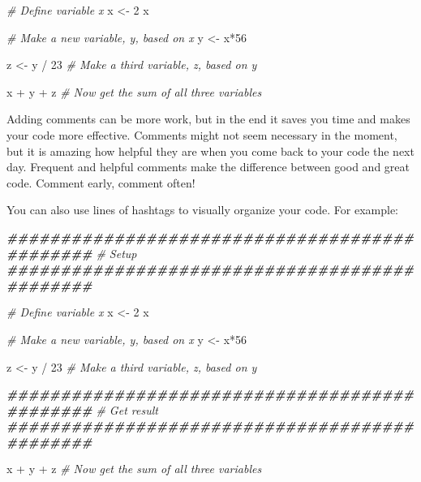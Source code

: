 \documentclass[
]{book}
\newenvironment{Shaded}{\begin{snugshade}}{\end{snugshade}}
\newcommand{\CommentTok}[1]{\textcolor[rgb]{0.56,0.35,0.01}{\textit{#1}}}
\newcommand{\DecValTok}[1]{\textcolor[rgb]{0.00,0.00,0.81}{#1}}
\newcommand{\DocumentationTok}[1]{\textcolor[rgb]{0.56,0.35,0.01}{\textbf{\textit{#1}}}}
\newcommand{\NormalTok}[1]{#1}
\newcommand{\OtherTok}[1]{\textcolor[rgb]{0.56,0.35,0.01}{#1}}
\newcommand{\SpecialCharTok}[1]{\textcolor[rgb]{0.00,0.00,0.00}{#1}}
\begin{document}
\begin{Shaded}
\begin{Highlighting}[]
\CommentTok{\# Define variable x}
\NormalTok{x }\OtherTok{\textless{}{-}} \DecValTok{2} 
\NormalTok{x}

\CommentTok{\# Make a new variable, y, based on x}
\NormalTok{y }\OtherTok{\textless{}{-}}\NormalTok{ x}\SpecialCharTok{*}\DecValTok{56}

\NormalTok{z }\OtherTok{\textless{}{-}}\NormalTok{ y }\SpecialCharTok{/} \DecValTok{23} \CommentTok{\# Make a third variable, z, based on y}
 
\NormalTok{x }\SpecialCharTok{+}\NormalTok{ y }\SpecialCharTok{+}\NormalTok{ z }\CommentTok{\# Now get the sum of all three variables}
\end{Highlighting}
\end{Shaded}

Adding comments can be more work, but in the end it saves you time and makes your code more effective. Comments might not seem necessary in the moment, but it is amazing how helpful they are when you come back to your code the next day. Frequent and helpful comments make the difference between good and great code. Comment early, comment often!

You can also use lines of hashtags to visually organize your code. For example:

\begin{Shaded}
\begin{Highlighting}[]
\DocumentationTok{\#\#\#\#\#\#\#\#\#\#\#\#\#\#\#\#\#\#\#\#\#\#\#\#\#\#\#\#\#\#\#\#\#\#\#\#\#\#\#\#\#\#\#\#\#\#}
\CommentTok{\# Setup}
\DocumentationTok{\#\#\#\#\#\#\#\#\#\#\#\#\#\#\#\#\#\#\#\#\#\#\#\#\#\#\#\#\#\#\#\#\#\#\#\#\#\#\#\#\#\#\#\#\#\#}

\CommentTok{\# Define variable x}
\NormalTok{x }\OtherTok{\textless{}{-}} \DecValTok{2} 
\NormalTok{x}

\CommentTok{\# Make a new variable, y, based on x}
\NormalTok{y }\OtherTok{\textless{}{-}}\NormalTok{ x}\SpecialCharTok{*}\DecValTok{56}

\NormalTok{z }\OtherTok{\textless{}{-}}\NormalTok{ y }\SpecialCharTok{/} \DecValTok{23} \CommentTok{\# Make a third variable, z, based on y}
 

\DocumentationTok{\#\#\#\#\#\#\#\#\#\#\#\#\#\#\#\#\#\#\#\#\#\#\#\#\#\#\#\#\#\#\#\#\#\#\#\#\#\#\#\#\#\#\#\#\#\#}
\CommentTok{\# Get result}
\DocumentationTok{\#\#\#\#\#\#\#\#\#\#\#\#\#\#\#\#\#\#\#\#\#\#\#\#\#\#\#\#\#\#\#\#\#\#\#\#\#\#\#\#\#\#\#\#\#\#}

\NormalTok{x }\SpecialCharTok{+}\NormalTok{ y }\SpecialCharTok{+}\NormalTok{ z }\CommentTok{\# Now get the sum of all three variables}
\end{Highlighting}
\end{Shaded}
\end{document}
